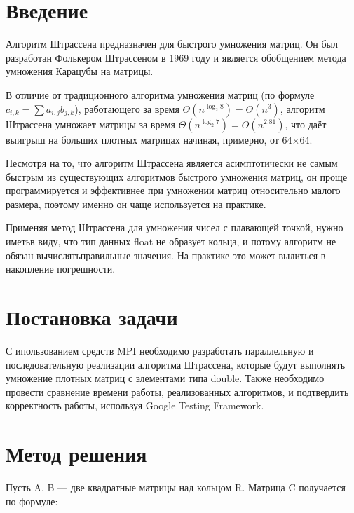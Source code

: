 \documentclass{report}
\begin{document}
\setcounter{page}{2}

\tableofcontents
\newpage

\section*{Введение}
Алгоритм Штрассена предназначен для быстрого умножения матриц. Он был разработан Фолькером Штрассеном в 1969 году и является обобщением метода умножения Карацубы на матрицы.

В отличие от традиционного алгоритма умножения матриц (по формуле ${\displaystyle c_{i,k}=\sum a_{i,j}b_{j,k}}$), работающего за время ${\displaystyle \Theta (n^{\log _{2}8})=\Theta (n^{3})}$, алгоритм Штрассена умножает матрицы за время ${\displaystyle \Theta (n^{\log _{2}7})=O(n^{2.81})}$, что даёт выигрыш на больших плотных матрицах начиная, примерно, от 64×64.

Несмотря на то, что алгоритм Штрассена является асимптотически не самым быстрым из существующих алгоритмов быстрого умножения матриц, он проще программируется и эффективнее при умножении матриц относительно малого размера, поэтому именно он чаще используется на практике. 

Применяя метод Штрассена для умножения чисел с плавающей точкой, нужно иметьв виду, что тип данных float не образует кольца, и потому алгоритм не обязан вычислятьправильные значения. На практике это может вылиться в накопление погрешности.
\newpage

\section*{Постановка задачи}
С ипользованием средств MPI необходимо разработать параллельную и последовательную реализации алгоритма Штрассена, которые будут выполнять умножение плотных матриц с элементами типа double. Также необходимо провести сравнение времени работы, реализованных алгоритмов, и подтвердить корректность работы, используя Google Testing Framework.
\newpage

\section*{Метод решения}
Пусть A, B — две квадратные матрицы над кольцом R. Матрица C получается по формуле:
\end{document}
